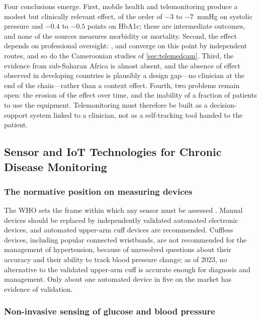 Four conclusions emerge. First, mobile health and telemonitoring produce a modest but clinically relevant effect, of the order of $-3$ to $-7$~mmHg on systolic pressure and $-0.4$ to $-0.5$ points on HbA1c; these are intermediate outcomes, and none of the sources measures morbidity or mortality. Second, the effect depends on professional oversight: \textcite{mao2020}, \textcite{bandeira2024} and \textcite{mihevc2025} converge on this point by independent routes, and so do the Cameroonian studies of \cref{sec:telemedcam}. Third, the evidence from sub-Saharan Africa is almost absent, and the absence of effect observed in developing countries is plausibly a design gap---no clinician at the end of the chain---rather than a context effect. Fourth, two problems remain open: the erosion of the effect over time, and the inability of a fraction of patients to use the equipment. Telemonitoring must therefore be built as a decision-support system linked to a clinician, not as a self-tracking tool handed to the patient.

\subsection{Sensor and IoT Technologies for Chronic Disease Monitoring}\label{sec:lr-iot}

\subsubsection{The normative position on measuring devices}\label{sec:metrology}

The WHO sets the frame within which any sensor must be assessed \parencite{who2023hypertension}. Manual devices should be replaced by independently validated automated electronic devices, and automated upper-arm cuff devices are recommended. Cuffless devices, including popular connected wristbands, are not recommended for the management of hypertension, because of unresolved questions about their accuracy and their ability to track blood pressure change; as of 2023, no alternative to the validated upper-arm cuff is accurate enough for diagnosis and management. Only about one automated device in five on the market has evidence of validation.

\subsubsection{Non-invasive sensing of glucose and blood pressure}\label{sec:cuffless}

